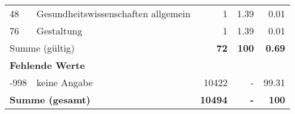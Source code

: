 \begin{longtable}{lXrrr}
     48 &
     \multicolumn{1}{X}{ Gesundheitswissenschaften allgemein   } &


       \num{1} &
       \num[round-mode=places,round-precision=2]{1.39} &
         \num[round-mode=places,round-precision=2]{0.01} \\

     76 &
     \multicolumn{1}{X}{ Gestaltung   } &


       \num{1} &
       \num[round-mode=places,round-precision=2]{1.39} &
         \num[round-mode=places,round-precision=2]{0.01} \\
     \midrule
     \multicolumn{2}{l}{Summe (gültig)} &
       \textbf{\num{72}} &
     \textbf{\num{100}} &
       \textbf{\num[round-mode=places,round-precision=2]{0.69}} \\
     \multicolumn{5}{l}{\textbf{Fehlende Werte}}\\
       -998 &
       keine Angabe &
         \num{10422} &
        - &
         \num[round-mode=places,round-precision=2]{99.31} \\
     \midrule
     \multicolumn{2}{l}{\textbf{Summe (gesamt)}} &
          \textbf{\num{10494}} &
        \textbf{-} &
        \textbf{\num{100}} \\
     \bottomrule
     \end{longtable}
     
